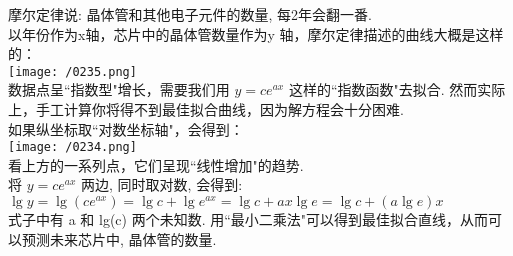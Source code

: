 \documentclass[UTF8]{ctexart}
\begin{document}
	\begin{myEnvSample}
		摩尔定律说: 晶体管和其他电子元件的数量, 每2年会翻一番. \\
		以年份作为x轴，芯片中的晶体管数量作为y
		轴，摩尔定律描述的曲线大概是这样的： \\
\texttt{[image: /0235.png]} \\		
		
		
	数据点呈``指数型"增长，需要我们用 $y=ce^{ax}$ 这样的``指数函数"去拟合. 然而实际上，手工计算你将得不到最佳拟合曲线，因为解方程会十分困难. \\
		
如果纵坐标取``对数坐标轴"，会得到：\\
\texttt{[image: /0234.png]} \\
看上方的一系列点，它们呈现``线性增加"的趋势. \\

将 $y=ce^{ax}$ 两边, 同时取对数, 会得到: \\
$
\lg y=\lg (ce^{ax})=\lg c+\lg e^{ax}=\lg c+ax\lg e=\lg c+(a\lg e)x
$ \\

式子中有 a 和 lg(c) 两个未知数. 用``最小二乘法"可以得到最佳拟合直线，从而可以预测未来芯片中, 晶体管的数量. 
	\end{myEnvSample}
\vspace{1em} 
\end{document}
